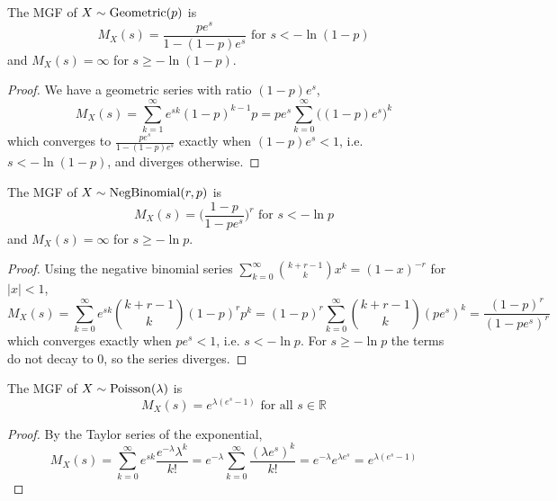 	\begin{theorem}
	  \label{thm:mgf-of-geometric-distribution}
		The MGF of \hyperref[def:geometric-random-variable]{$X \sim \operatorname{Geometric}(p)$} is 
		\begin{equation}
			M_X (s) = \frac{p e^s}{1 - (1 - p) e^s} \text{ for } s < -\ln(1 - p)
		\end{equation}
		and $M_X (s) = \infty$ for $s \geq -\ln(1-p)$. 
	\end{theorem}
	\begin{proof}
		We have a geometric series with ratio $(1 - p) e^s$, 
		\begin{equation}
			M_X (s) = \sum_{k=1}^\infty e^{s k} (1 - p)^{k-1} p = p e^s \sum_{k=0}^\infty \big( (1 - p) e^s \big)^k
		\end{equation}
		which converges to $\frac{p e^s}{1 - (1-p) e^s}$ exactly when $(1-p) e^s < 1$, i.e. $s < -\ln(1-p)$, and diverges otherwise. 
	\end{proof}

	\begin{theorem}
	  \label{thm:mgf-of-negative-binomial-distribution}
		The MGF of \hyperref[def:negative-binomial-distribution]{$X \sim \operatorname{NegBinomial}(r, p)$} is 
		\begin{equation}
			M_X (s) = \bigg( \frac{1 - p}{1 - p e^s} \bigg)^r \text{ for } s < -\ln p
		\end{equation}
		and $M_X (s) = \infty$ for $s \geq -\ln p$. 
	\end{theorem}
	\begin{proof}
		Using the negative binomial series $\sum_{k=0}^\infty \binom{k + r - 1}{k} x^k = (1 - x)^{-r}$ for $|x| < 1$, 
		\begin{equation}
			M_X (s) = \sum_{k=0}^\infty e^{s k} \binom{k + r - 1}{k} (1 - p)^r p^k = (1 - p)^r \sum_{k=0}^\infty \binom{k + r - 1}{k} (p e^s)^k = \frac{(1 - p)^r}{(1 - p e^s)^r}
		\end{equation}
		which converges exactly when $p e^s < 1$, i.e. $s < -\ln p$. For $s \geq -\ln p$ the terms do not decay to $0$, so the series diverges. 
	\end{proof}

	\begin{theorem}
	  \label{thm:mgf-of-poisson-distribution}
		The MGF of \hyperref[def:poisson-random-variable]{$X \sim \operatorname{Poisson}(\lambda)$} is 
		\begin{equation}
			M_X (s) = e^{\lambda (e^s - 1)} \text{ for all } s \in \mathbb{R}
		\end{equation}
	\end{theorem}
	\begin{proof}
		By the Taylor series of the exponential, 
		\begin{equation}
			M_X (s) = \sum_{k=0}^\infty e^{s k} \frac{e^{-\lambda} \lambda^k}{k!} = e^{-\lambda} \sum_{k=0}^\infty \frac{(\lambda e^s)^k}{k!} = e^{-\lambda} e^{\lambda e^s} = e^{\lambda (e^s - 1)}
		\end{equation}
	\end{proof}


